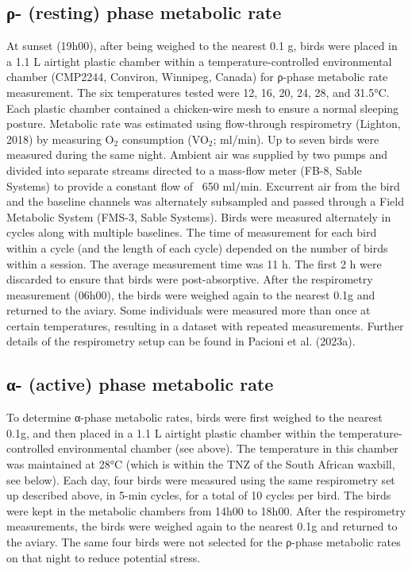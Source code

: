 \documentclass[10pt, twoside]{book} %
\begin{document}
\subsection{ρ- (resting) phase metabolic rate}
At sunset (19h00), after being weighed to the nearest 0.1 g, birds were placed in a 1.1 L airtight plastic chamber within a temperature-controlled environmental chamber (CMP2244, Conviron, Winnipeg, Canada) for ρ-phase metabolic rate measurement. The six temperatures tested were 12, 16, 20, 24, 28, and 31.5°C. Each plastic chamber contained a chicken-wire mesh to ensure a normal sleeping posture. Metabolic rate was estimated using flow‐through respirometry (Lighton, 2018) by measuring O$_{\text{2}}$ consumption (VO$_{\text{2}}$; ml/min). Up to seven birds were measured during the same night. Ambient air was supplied by two pumps and divided into separate streams directed to a mass-flow meter (FB-8, Sable Systems) to provide a constant flow of ~650 ml/min. Excurrent air from the bird and the baseline channels was alternately subsampled and passed through a Field Metabolic System (FMS-3, Sable Systems). Birds were measured alternately in cycles along with multiple baselines. The time of measurement for each bird within a cycle (and the length of each cycle) depended on the number of birds within a session. The average measurement time was 11 h. The first 2 h were discarded to ensure that birds were post-absorptive. After the respirometry measurement (06h00), the birds were weighed again to the nearest 0.1g and returned to the aviary. Some individuals were measured more than once at certain temperatures, resulting in a dataset with repeated measurements. Further details of the respirometry setup can be found in Pacioni et al. (2023a).\\

\subsection{α- (active) phase metabolic rate}
To determine α-phase metabolic rates, birds were first weighed to the nearest 0.1g, and then placed in a 1.1 L airtight plastic chamber within the temperature-controlled environmental chamber (see above). The temperature in this chamber was maintained at 28°C (which is within the TNZ of the South African waxbill, see below). Each day, four birds were measured using the same respirometry set up described above, in 5-min cycles, for a total of 10 cycles per bird. The birds were kept in the metabolic chambers from 14h00 to 18h00. After the respirometry measurements, the birds were weighed again to the nearest 0.1g and returned to the aviary. The same four birds were not selected for the ρ-phase metabolic rates on that night to reduce potential stress. \\
\end{document}
